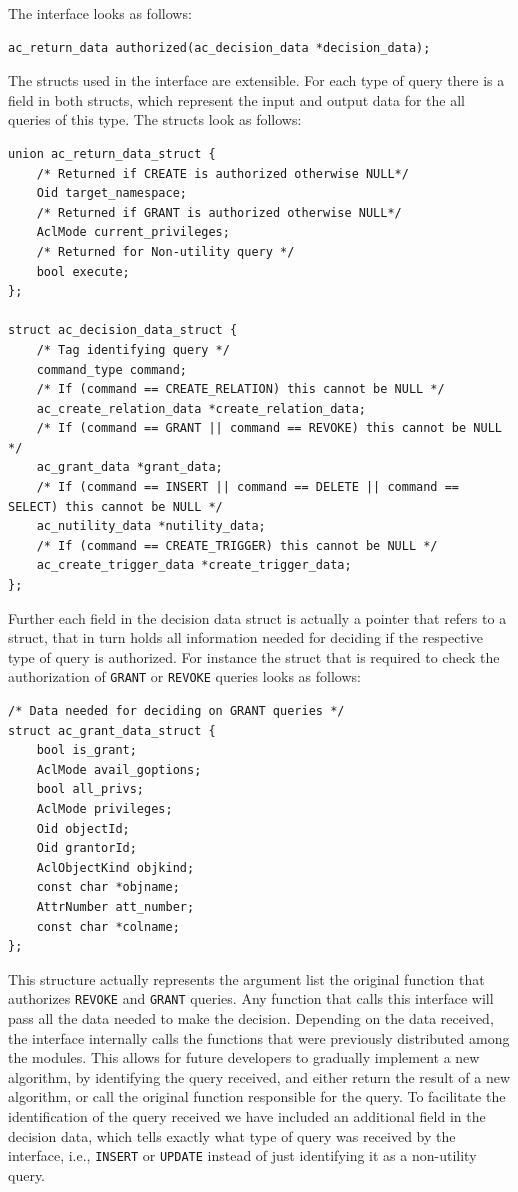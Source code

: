 The interface looks as follows:
%
\begin{lstlisting}[frame=single, style=customc]
ac_return_data authorized(ac_decision_data *decision_data);
\end{lstlisting}
%
The structs used in the interface are extensible. For each type of query there is a field in both structs, which represent the input and output data for the all queries of this type.
%
The structs look as follows:
\begin{lstlisting}[frame=single, style=customc]
union ac_return_data_struct {
	/* Returned if CREATE is authorized otherwise NULL*/
	Oid target_namespace; 
	/* Returned if GRANT is authorized otherwise NULL*/
	AclMode current_privileges; 
	/* Returned for Non-utility query */
	bool execute; 
};

struct ac_decision_data_struct {
	/* Tag identifying query */
	command_type command;
	/* If (command == CREATE_RELATION) this cannot be NULL */
	ac_create_relation_data *create_relation_data; 
	/* If (command == GRANT || command == REVOKE) this cannot be NULL */
	ac_grant_data *grant_data; 
	/* If (command == INSERT || command == DELETE || command == SELECT) this cannot be NULL */
	ac_nutility_data *nutility_data; 
	/* If (command == CREATE_TRIGGER) this cannot be NULL */
	ac_create_trigger_data *create_trigger_data; 
};
\end{lstlisting}
%
Further each field in the decision data struct is actually a pointer that refers to a struct, that in turn holds all information needed for deciding if the respective type of query is authorized.
%
For instance the struct that is required to check the authorization of \texttt{GRANT} or \texttt{REVOKE} queries looks as follows:
%
\begin{lstlisting}[frame=single, style=customc]
/* Data needed for deciding on GRANT queries */
struct ac_grant_data_struct {
	bool is_grant;
	AclMode avail_goptions;
	bool all_privs;
	AclMode privileges;
	Oid objectId;
	Oid grantorId;
	AclObjectKind objkind;
	const char *objname;
	AttrNumber att_number;
	const char *colname;
};
\end{lstlisting}
%
This structure actually represents the argument list the original function that authorizes \texttt{REVOKE} and \texttt{GRANT} queries.
%
Any function that calls this interface will pass all the data needed to make the decision.
%
Depending on the data received, the interface internally calls the functions that were previously distributed among the modules.
%
This allows for future developers to gradually implement a new algorithm, by identifying the query received, and either return the result of a new algorithm, or call the original function responsible for the query.
%
To facilitate the identification of the query received we have included an additional field in the decision data, which tells exactly what type of query was received by the interface, i.e., \texttt{INSERT} or \texttt{UPDATE} instead of just identifying it as a non-utility query.

